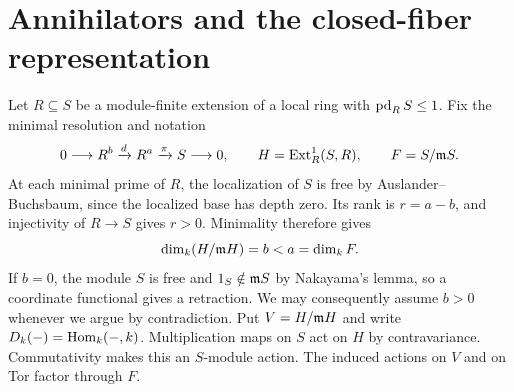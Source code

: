 \section{Annihilators and the closed-fiber representation}\label{homol}
Let $R\subseteq S$ be a module-finite extension of a local ring with $\operatorname{pd}_R S\le1$. Fix the minimal resolution and notation
\begin{equation}\label{homol-resolution}
 0\longrightarrow R^b\xrightarrow{d}R^a
   \xrightarrow{\pi}S\longrightarrow0,
 \qquad H=\operatorname{Ext}^1_R(S,R),\qquad F=S/\mathfrak m S.
\end{equation}
At each minimal prime of $R$, the localization of $S$ is free by
Auslander--Buchsbaum, since the localized base has depth zero.  Its rank
is $r=a-b$, and injectivity of $R\to S$ gives $r>0$.  Minimality therefore
gives
\[
 \dim_k(H/\mathfrak m H)=b<a=\dim_k F.
\]
If $b=0$, the module $S$ is free and $1_S\notin\mathfrak m S$ by Nakayama's lemma, so a coordinate functional gives a retraction.
We may consequently assume $b>0$ whenever we argue by contradiction.
Put $V=H/\mathfrak m H$ and write $D_k(-)=\operatorname{Hom}_k(-,k)$.  Multiplication maps on
$S$ act on $H$ by contravariance. Commutativity makes this an
$S$-module action.  The induced actions on $V$ and on Tor factor
through $F$.

